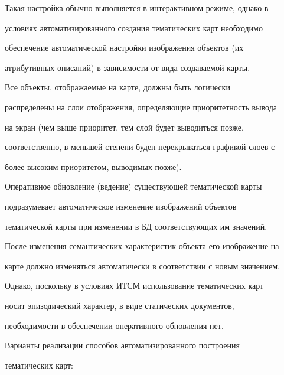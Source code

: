 Такая настройка обычно выполняется в интерактивном режиме, однако в 


условиях автоматизированного создания тематических карт необходимо 


обеспечение автоматической настройки изображения объектов (их 


атрибутивных описаний) в зависимости от вида создаваемой карты.


     


     Все объекты, отображаемые на карте, должны быть логически 


распределены на слои отображения, определяющие приоритетность вывода 


на экран (чем выше приоритет, тем слой будет выводиться позже, 


соответственно, в меньшей степени буден перекрываться графикой слоев с 


более высоким приоритетом, выводимых позже).


     


     Оперативное обновление (ведение) существующей тематической карты 


подразумевает автоматическое изменение изображений объектов 


тематической карты при изменении в БД соответствующих им значений. 


После изменения семантических характеристик объекта его изображение на 


карте должно изменяться автоматически в соответствии с новым значением. 


Однако, поскольку в условиях ИТСМ использование тематических карт 


носит эпизодический характер, в виде статических документов, 


необходимости в обеспечении оперативного обновления нет.


     


     Варианты реализации способов автоматизированного построения 


тематических карт:


